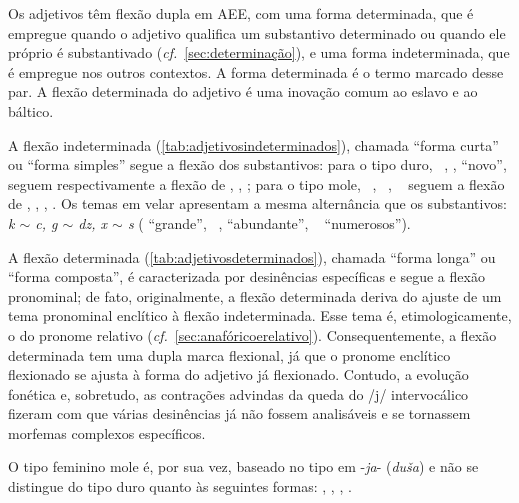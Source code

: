 Os adjetivos têm flexão dupla em AEE, com uma forma determinada, que é
empregue quando o adjetivo qualifica um substantivo determinado ou
quando ele próprio é substantivado (\emph{cf.}~\ref{sec:determinação}), e uma forma
indeterminada, que é empregue nos outros contextos. A forma determinada
é o termo marcado desse par. A flexão determinada do adjetivo é uma
inovação comum ao eslavo e ao báltico.

A flexão indeterminada (\autoref{tab:adjetivosindeterminados}), chamada ``forma curta'' ou ``forma
simples'' segue a flexão dos substantivos: para o tipo duro, ~,  ,  
``novo'',
seguem respectivamente a flexão de , ,
; para o tipo mole, ~,
~, ~ seguem a
flexão de , , ,
. Os temas em velar apresentam a mesma alternância que os
substantivos: \emph{k $\sim$ c, g $\sim$ dz, x
$\sim$ s} ( ``grande'',
~,  ``abundante'',
~ ``numerosos'').



A flexão determinada (\autoref{tab:adjetivosdeterminados}), chamada ``forma
longa'' ou ``forma
composta'', é caracterizada por desinências específicas e segue a flexão
pronominal; de fato, originalmente, a flexão determinada deriva do
ajuste de um tema pronominal enclítico à flexão indeterminada. Esse tema
é, etimologicamente, o do pronome relativo (\emph{cf.}~\ref{sec:anafóricoerelativo}).
Consequentemente, a flexão determinada tem uma dupla marca flexional, já
que o pronome enclítico flexionado se ajusta à forma do adjetivo já
flexionado. Contudo, a evolução fonética e, sobretudo, as contrações
advindas da queda do /j/ intervocálico fizeram com que várias
desinências já não fossem analisáveis e se tornassem morfemas complexos
específicos.



O tipo feminino mole é, por sua vez, baseado no tipo em -\emph{ja}-
(\emph{duša}) e não se distingue do tipo duro quanto às seguintes
formas:  ,  ,
 ,  .

